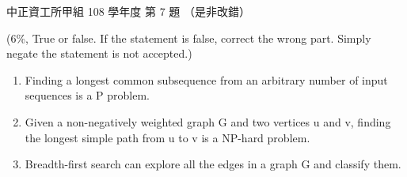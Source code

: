 \begin{pastexam}[label={px:ccu-108-swa-06}]{中正資工所甲組 108 學年度 第 7 題}
（是非改錯）

(6\%, True or false. If the statement is false, correct the wrong part. Simply negate the
statement is not accepted.)
\begin{enumerate}[label=(\alph*)]
\item Finding a longest common subsequence from an arbitrary number of input sequences is a P
problem.
\item Given a non-negatively weighted graph G and two vertices u and v, finding the longest simple
path from u to v is a NP-hard problem.
\item Breadth-first search can explore all the edges in a graph G and classify them.
\end{enumerate}
\end{pastexam}

